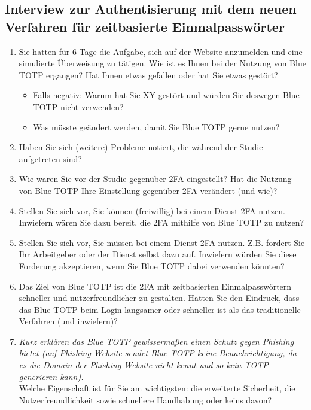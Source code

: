 \subsection{Interview zur Authentisierung mit dem neuen Verfahren für zeitbasierte Einmalpasswörter}
\label{anh: interview authentisierung}

\begin{enumerate}
    \item Sie hatten für 6 Tage die Aufgabe, sich auf der Website anzumelden und eine simulierte Überweisung zu tätigen. Wie ist es Ihnen bei der Nutzung von Blue TOTP ergangen? Hat Ihnen etwas gefallen oder hat Sie etwas gestört?
    \begin{itemize}
        \item Falls negativ:
        Warum hat Sie XY gestört und würden Sie deswegen  Blue TOTP nicht verwenden?
        \item Was müsste geändert werden, damit Sie Blue TOTP gerne nutzen?
    \end{itemize}
    \item Haben Sie sich (weitere) Probleme notiert, die während der Studie aufgetreten sind?
    \item Wie waren Sie vor der Studie gegenüber 2FA eingestellt? Hat die Nutzung von Blue TOTP Ihre Einstellung gegenüber 2FA verändert (und wie)?
    \item Stellen Sie sich vor, Sie können (freiwillig) bei einem Dienst 2FA nutzen. Inwiefern wären Sie dazu bereit, die 2FA mithilfe von Blue TOTP zu nutzen?
    \item Stellen Sie sich vor, Sie müssen bei einem Dienst 2FA nutzen. Z.B. fordert Sie Ihr Arbeitgeber oder der Dienst selbst dazu auf. Inwiefern würden Sie diese Forderung akzeptieren, wenn Sie Blue TOTP dabei verwenden könnten?
    \item Das Ziel von Blue TOTP ist die 2FA mit zeitbasierten Einmalpasswörtern schneller und nutzerfreundlicher zu gestalten. Hatten Sie den Eindruck, dass das Blue TOTP beim Login langsamer oder schneller ist als das traditionelle Verfahren (und inwiefern)?
    \item \textit{Kurz erklären das Blue TOTP gewissermaßen einen Schutz gegen Phishing bietet (auf Phishing-Website sendet Blue TOTP keine Benachrichtigung, da es die Domain der Phishing-Website nicht kennt und so kein TOTP generieren kann).}\\
    Welche Eigenschaft ist für Sie am wichtigsten: die erweiterte Sicherheit, die Nutzerfreundlichkeit sowie schnellere Handhabung oder keins davon?

\end{enumerate}
